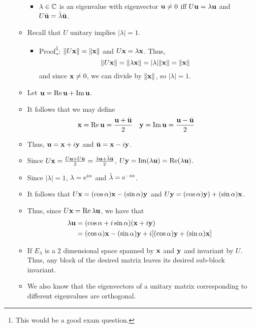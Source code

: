 \documentclass[../../notes.tex]{subfiles}
\begin{document}
\begin{itemize}
\begin{itemize}
\begin{itemize}
            \item $\lambda\in\C$ is an eigenvalue with eigenvector $\um\neq 0$ iff $U\um=\lambda\um$ and $U\bar{\um}=\bar{\lambda}\bar{\um}$.
        \end{itemize}
        \item Recall that $U$ unitary implies $|\lambda|=1$.
        \begin{itemize}
            \item Proof\footnote{This would be a good exam question.}: $\norm{U\x}=\norm{\x}$ and $U\x=\lambda\x$. Thus,
            \begin{equation*}
                \norm{U\x} = \norm{\lambda\x} = |\lambda|\norm{\x} = \norm{\x}
            \end{equation*}
            and since $\x\neq 0$, we can divide by $\norm{\x}$, so $|\lambda|=1$.
        \end{itemize}
        \item Let $\um=\Re\um+\Im\um$.
        \item It follows that we may define
        \begin{align*}
            \x &= \Re\um = \frac{\um+\bar{\um}}{2}&
            \y &= \Im\um = \frac{\um-\bar{\um}}{2}
        \end{align*}
        \item Thus, $\um=\x+i\y$ and $\bar{\um}=\x-i\y$.
        \item Since $U\x=\frac{U\um+U\bar{\um}}{2}=\frac{\lambda\um+\bar{\lambda}\bar{\um}}{2}$, $U\y=\Im(\lambda\um)=\Re(\lambda\um)$.
        \item Since $|\lambda|=1$, $\lambda=\e[i\alpha]$ and $\bar{\lambda}=\e[-i\alpha]$.
        \item It follows that $U\x=(\cos\alpha)\x-(\sin\alpha)\y$ and $U\y=(\cos\alpha)\y)+(\sin\alpha)\x$.
        \item Thus, since $U\x=\Re\lambda\um$, we have that
        \begin{align*}
            \lambda\um &= (\cos\alpha+i\sin\alpha)(\x+i\y)\\
            &= (\cos\alpha)\x-(\sin\alpha)\y+i[(\cos\alpha)\y+(\sin\alpha)\x]
        \end{align*}
        \item If $E_\lambda$ is a 2 dimensional space spanned by $\x$ and $\y$ and invariant by $U$. Thus, any block of the desired matrix leaves its desired sub-block invariant.
        \item We also know that the eigenvectors of a unitary matrix corresponding to different eigenvalues are orthogonal.

\end{itemize}
\end{itemize}
\end{document}
